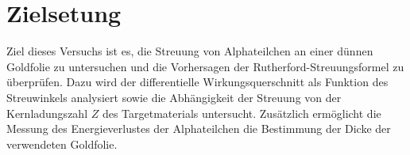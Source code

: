 \section{Zielsetung}

Ziel dieses Versuchs ist es, die Streuung von Alphateilchen an einer dünnen Goldfolie zu untersuchen und die Vorhersagen der Rutherford-Streuungsformel zu überprüfen. 
Dazu wird der differentielle Wirkungsquerschnitt als Funktion des Streuwinkels analysiert sowie die Abhängigkeit der Streuung von der Kernladungszahl $Z$ des Targetmaterials untersucht. 
Zusätzlich ermöglicht die Messung des Energieverlustes der Alphateilchen die Bestimmung der Dicke der verwendeten Goldfolie.
